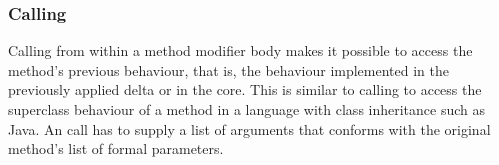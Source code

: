 % 
% 

\subsubsection{Calling }
Calling  from within a method modifier body makes it
possible to access the method's previous behaviour, that is, the behaviour
implemented in the previously applied delta or in the core. This is similar to
calling  to access the superclass behaviour of a method in a language
with class inheritance such as Java. An  call has to supply a list
of arguments that conforms with the original method's list of formal parameters.

